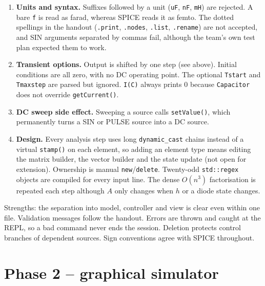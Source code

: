 \begin{enumerate}[leftmargin=2em]
  \item {} \textbf{Units and syntax.} Suffixes followed by a unit (\texttt{uF}, \texttt{nF}, \texttt{mH}) are rejected.
    A bare \texttt{f} is read as farad, whereas SPICE reads it as femto. The dotted spellings in the
    handout (\texttt{.print}, \texttt{.nodes}, \texttt{.list}, \texttt{.rename}) are not accepted, and SIN arguments
    separated by commas fail, although the team's own test plan expected them to work.
  \item {} \textbf{Transient options.} Output is shifted by one step (see above). Initial conditions are all
    zero, with no DC operating point. The optional \texttt{Tstart} and \texttt{Tmaxstep} are parsed but ignored.
    \texttt{I(C)} always prints 0 because \texttt{Capacitor} does not override \texttt{getCurrent()}.
  \item {} \textbf{DC sweep side effect.} Sweeping a source calls \texttt{setValue()}, which permanently turns a
    SIN or PULSE source into a DC source.
  \item {} \textbf{Design.} Every analysis step uses long \texttt{dynamic\_cast} chains instead of a virtual
    \texttt{stamp()} on each element, so adding an element type means editing the matrix builder, the vector
    builder and the state update (not open for extension). Ownership is manual \texttt{new}/\texttt{delete}.
    Twenty-odd \texttt{std::regex} objects are compiled for every input line. The dense $O(n^3)$ factorisation is
    repeated each step although $A$ only changes when $h$ or a diode state changes.
\end{enumerate}
Strengths: the separation into model, controller and view is clear even within one file. Validation messages
follow the handout. Errors are thrown and caught at the REPL, so a bad command never ends the session.
Deletion protects control branches of dependent sources. Sign conventions agree with SPICE throughout.

\section{Phase 2 -- graphical simulator}

